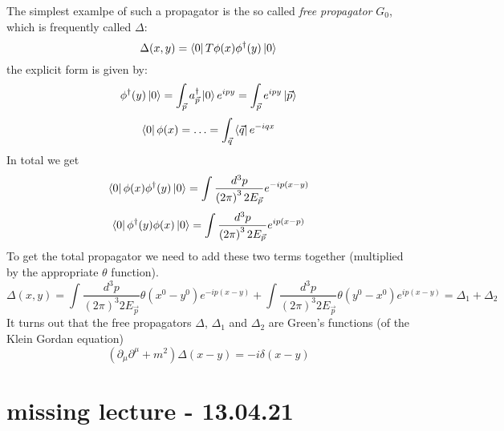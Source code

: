 \documentclass{report}
\begin{document}
The simplest examlpe of such a propagator is the so called \emph{free propagator} $G_0$, which is frequently called $\Delta$: \[
	\Delta(x,y) = \bra{0} T \phi(x) \phi^\dagger(y) \ket{0}
\] the explicit form is given by: \[
\phi^\dagger(y) \ket{0} = \int_{\vec{p}} a_{\vec{p}}^\dagger \ket{0}e^{ipy} = \int_{\vec{p}} e^{ipy} \ket{\vec{p}}
\] \[
\bra{0} \phi(x) = \ldots = \int_{\vec{q}} \bra{\vec{q}} e^{-iqx}
\] In total we get \[
\bra{0} \phi(x) \phi^\dagger(y) \ket{0} = \int \frac{d^3p}{\left( 2 \pi \right)^3 2 E_{\vec{p}}} e^{-ip(x-y)} 
\] \[
\bra{0} \phi^\dagger(y) \phi(x) \ket{0} = \int \frac{d^3 p}{\left( 2 \pi \right)^3 2 E_{\vec{p}}} e^{ip(x-p)}
\] To get the total propagator we need to add these two terms together (multiplied by the appropriate $\theta$ function). \[
\Delta(x,y) = \int \frac{d^3p}{\left( 2 \pi \right)^3 2 E_{\vec{p}}} \theta(x^0 - y^0) e^{-ip(x-y)} + \int \frac{d^3p}{\left( 2 \pi \right)^3 2 E_{\vec{p}}} \theta(y^0 - x^0) e^{ip(x-y)} = \Delta_1 + \Delta_2
\] It turns out that the free propagators $\Delta $, $\Delta_1$ and $\Delta_2$ are Green's functions (of the Klein Gordan equation) \[
\left( \partial_\mu \partial^\mu + m^2   \right) \Delta(x-y) = -i \delta(x-y)
\] 
\chapter{ missing lecture - 13.04.21}
\end{document}
